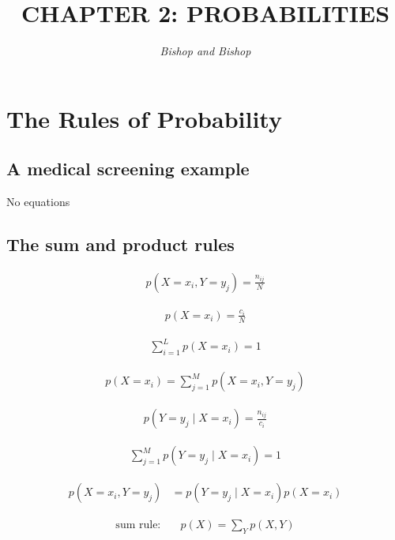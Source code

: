 \documentclass{article}
\title{\LARGE\scshape\MakeUppercase{Chapter 2: Probabilities}}
\author{\textit{Bishop and Bishop}}
\date{}
\begin{document}
\maketitle

\section{The Rules of Probability}

\subsection{A medical screening example}
No equations

\subsection{The sum and product rules}

\begin{align*}
p\left(X=x_{i}, Y=y_{j}\right)=\frac{n_{i j}}{N} 
\tag{2.1}
\end{align*}

\begin{align*}
p\left(X=x_{i}\right)=\frac{c_{i}}{N}
\tag{2.2}
\end{align*}

\begin{align*}
\sum_{i=1}^{L} p\left(X=x_{i}\right)=1
\tag{2.3}
\end{align*}

\begin{align*}
p\left(X=x_{i}\right)=\sum_{j=1}^{M} p\left(X=x_{i}, Y=y_{j}\right)
\tag{2.4}
\end{align*}

\begin{align*}
p\left(Y=y_{j} \mid X=x_{i}\right)=\frac{n_{i j}}{c_{i}}
\tag{2.5}
\end{align*}

\begin{align*}
\sum_{j=1}^{M} p\left(Y=y_{j} \mid X=x_{i}\right)=1
\tag{2.6}
\end{align*}

\begin{align*}
p\left(X=x_{i}, Y=y_{j}\right) & =p\left(Y=y_{j} \mid X=x_{i}\right) p\left(X=x_{i}\right)
\tag{2.7}
\end{align*}

\begin{align*}
\text{sum rule:} \quad & p(X)=\sum_{Y} p(X, Y)
\tag{2.8}
\end{align*}
\end{document}
